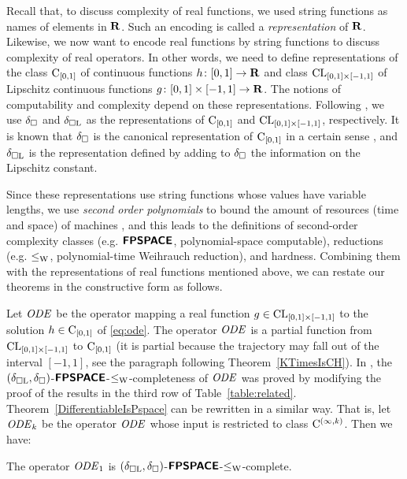 Recall that, to discuss complexity of real functions,
we used string functions as names of elements in $\mathbf R$. 
Such an encoding is called a \emph{representation} of $\mathbf R$.
Likewise, 
we now want to encode real functions by string functions
to discuss complexity of real operators. 
In other words, we need to define representations of
the class $\mathrm C _{[0, 1]}$ of continuous functions $h \colon [0,1] \to \mathbf R$ 
and class $\mathrm{CL} _{[0, 1] \times [-1, 1]}$ of Lipschitz continuous functions $g \colon [0, 1] \times [-1, 1] \to \mathbf R$. 
The notions of computability and complexity depend on these representations.
Following \cite{kawamura2010operators},
we use $\delta _\square$ and $\delta _{\square \mathrm L}$ as the 
representations of $\mathrm C_{[0,1]}$ and $\mathrm{CL}_{[0, 1] \times [-1, 1]}$, 
respectively.
It is known that 
$\delta _\square$ is the canonical representation of $\mathrm C_{[0, 1]}$ 
in a certain sense \cite{kawamura11:_funct_space_repres_and_polyn_time_comput}, 
and $\delta _{\square \mathrm L}$ is the representation defined by adding to $\delta _\square$
the information on the Lipschitz constant.

Since these representations use string functions 
whose values have variable lengths,
we use \emph{second order polynomials}
to bound the amount of resources (time and space) of machines
\cite{kawamura2010operators}, 
and this leads to the definitions of second-order complexity classes
(e.g. $\text{\bfseries \sffamily \upshape FPSPACE}$, polynomial-space computable),
reductions (e.g. $\leq _{\mathrm W}$, polynomial-time Weihrauch reduction), 
and hardness.
Combining them with the representations of real functions mentioned above,
we can restate our theorems in the constructive form as follows.

Let $\mathit{ODE}$ be the operator 
mapping a real function $g \in \mathrm{CL}_{[0, 1] \times [-1, 1]}$ to
the solution $h \in \mathrm C_{[0, 1]}$ of \eqref{eq:ode}.
The operator $\mathit{ODE}$ is a partial function 
from $\mathrm{CL} _{[0, 1] \times [-1, 1]}$ to $\mathrm C _{[0, 1]}$
(it is partial because the trajectory may fall out of the interval $[-1, 1]$, 
see the paragraph following Theorem~\ref{KTimesIsCH}).
In \cite[Theorem 4.9]{kawamura2010operators}, the
$(\delta _{\square \mathrm L}, \delta _\square)$-$\text{\bfseries \sffamily \upshape FPSPACE}$-$\leq _{\mathrm W}$-completeness of $\mathit{ODE}$ 
was proved
by modifying
the proof of the results in the third row of Table~\ref{table:related}.
Theorem~\ref{DifferentiableIsPspace} can be rewritten in a similar way. 
That is, let $\mathit{ODE} _k$ be the operator $\mathit{ODE}$ whose input is restricted to class $\mathrm C^{(\infty, k)}$. Then we have: 

\begin{theorem}
\label{theorem: C1 constructive}
The operator $\mathit{ODE} _1$ is $(\delta _{\square \mathrm L}, \delta _\square)$-$\text{\bfseries \sffamily \upshape FPSPACE}$-$\leq _{\mathrm W}$-complete.
\end{theorem}

